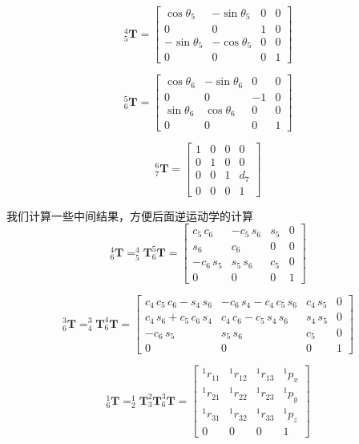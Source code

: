 \documentclass{homework}
\begin{document}
\begin{sol}
\[
  _5^4\mathbf{T} =
  \begin{bmatrix}
    \cos\theta_5 & -\sin\theta_5 & 0 & 0 \\
    0 & 0 & 1 & 0 \\
    -\sin\theta_5 & -\cos\theta_5 & 0 & 0 \\
    0 & 0 & 0 & 1
  \end{bmatrix}
\]

\[
  _6^5\mathbf{T} =
  \begin{bmatrix}
    \cos\theta_6 & -\sin\theta_6 & 0 & 0 \\
    0 & 0 & -1 & 0 \\
    \sin\theta_6 & \cos\theta_6 & 0 & 0 \\
    0 & 0 & 0 & 1
  \end{bmatrix}
\]

\[
  _7^6\mathbf{T} =
  \begin{bmatrix}
    1 & 0 & 0 & 0 \\
    0 & 1 & 0 & 0 \\
    0 & 0 & 1 & d_7 \\
    0 & 0 & 0 & 1
  \end{bmatrix}
\]

我们计算一些中间结果，方便后面逆运动学的计算
\[
  _6^4\mathbf{T} = _5^4\mathbf{T} _6^5\mathbf{T} =
  \begin{bmatrix} 
    c_{5}\,c_{6} & -c_{5}\,s_{6} & s_{5} & 0 \\ 
    s_{6} & c_{6} & 0 & 0 \\ 
    -c_{6}\,s_{5} & s_{5}\,s_{6} & c_{5} & 0 \\ 
    0 & 0 & 0 & 1
  \end{bmatrix}
\]

\[
  _6^3\mathbf{T} = _4^3\mathbf{T} _6^4\mathbf{T} =
  \begin{bmatrix} 
    c_{4}\,c_{5}\,c_{6}-s_{4}\,s_{6} & -c_{6}\,s_{4}-c_{4}\,c_{5}\,s_{6} & c_{4}\,s_{5} & 0 \\ 
    c_{4}\,s_{6}+c_{5}\,c_{6}\,s_{4} & c_{4}\,c_{6}-c_{5}\,s_{4}\,s_{6} & s_{4}\,s_{5} & 0 \\ 
    -c_{6}\,s_{5} & s_{5}\,s_{6} & c_{5} & 0 \\ 
    0 & 0 & 0 & 1
  \end{bmatrix}
\]

\[
  _6^1\mathbf{T} = _2^1\mathbf{T} _3^2\mathbf{T} _6^3\mathbf{T} =
  \begin{bmatrix} 
    {^1}r_{11} & {^1}r_{12} & {^1}r_{13} & {^1}p_x \\ 
    {^1}r_{21} & {^1}r_{22} & {^1}r_{23} & {^1}p_y \\ 
    {^1}r_{31} & {^1}r_{32} & {^1}r_{33} & {^1}p_z \\ 
    0 & 0 & 0 & 1
  \end{bmatrix}
\] 


\end{sol}
\end{document}

